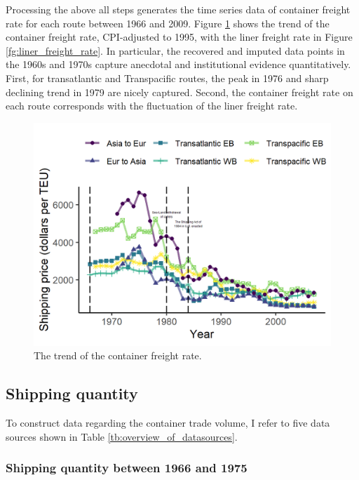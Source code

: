 Processing the above all steps generates the time series data of container freight rate for each route between 1966 and 2009. Figure \ref{fg:container_freight_rate_each_route} shows the trend of the container freight rate, CPI-adjusted to 1995, with the liner freight rate in Figure \ref{fg:liner_freight_rate}. In particular, the recovered and imputed data points in the 1960s and 1970s capture anecdotal and institutional evidence quantitatively. First, for transatlantic and Transpacific routes, the peak in 1976 and sharp declining trend in 1979 are nicely captured. Second, the container freight rate on each route corresponds with the fluctuation of the liner freight rate.

\begin{figure}[!ht]
\begin{center}
\includegraphics[height = 0.5\textheight]{figuretable/container_freight_rate_each_route.png}
\end{center}
\caption{The trend of the container freight rate.}
\label{fg:container_freight_rate_each_route}
\end{figure}

\subsection{Shipping quantity}

To construct data regarding the container trade volume, I refer to five data sources shown in Table \ref{tb:overview_of_datasources}.

\subsubsection{Shipping quantity between 1966 and 1975}

